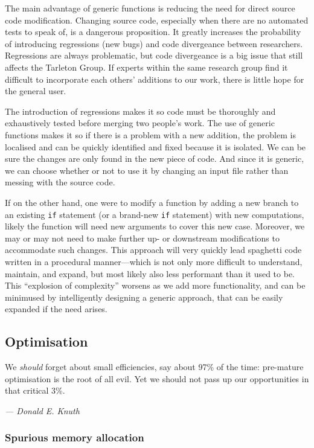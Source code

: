 The main advantage of generic functions is reducing the need for direct source code modification. Changing source code, especially when there are no automated tests to speak of, is a dangerous proposition. It greatly increases the probability of introducing regressions (new bugs) and code divergeance between researchers. Regressions are always problematic, but code divergeance is a big issue that still affects the Tarleton Group. If experts within the same research group find it difficult to incorporate each others' additions to our work, there is little hope for the general user.

The introduction of regressions makes it so code must be thoroughly and exhaustively tested before merging two people's work. The use of generic functions makes it so if there is a problem with a new addition, the problem is localised and can be quickly identified and fixed because it is isolated. We can be sure the changes are only found in the new piece of code. And since it is generic, we can choose whether or not to use it by changing an input file rather than messing with the source code.

If on the other hand, one were to modify a function by adding a new branch to an existing \texttt{if} statement (or a brand-new \texttt{if} statement) with new computations, likely the function will need new arguments to cover this new case. Moreover, we may or may not need to make further up- or downstream modifications to accommodate such changes. This approach will very quickly lead spaghetti code written in a procedural manner---which is not only more difficult to understand, maintain, and expand, but most likely also less performant than it used to be. This ``explosion of complexity'' worsens as we add more functionality, and can be minimused by intelligently designing a generic approach, that can be easily expanded if the need arises.

\subsection{Optimisation}
\renewcommand{\epigraphflush}{flushright}
\renewcommand{\textflush}{flushright}
\setlength{\epigraphwidth}{0.75\linewidth}
\epigraph{We \emph{should} forget about small efficiencies, say about 97\% of the time: pre-mature optimisation is the root of all evil. Yet we should not pass up our opportunities in that critical 3\%.}{\textit{--- Donald E. Knuth \cite[p.~268]{knuth1974structured}}}

\subsubsection{Spurious memory allocation}

